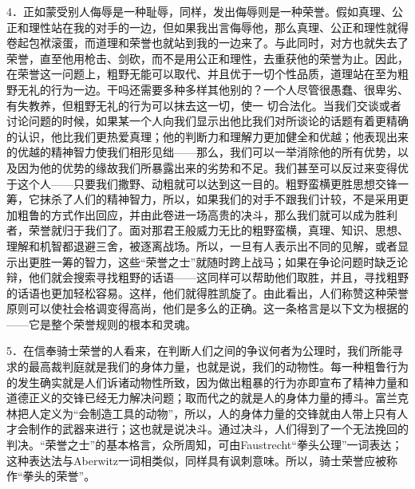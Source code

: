 \documentclass[12pt,oneside]{book}
\begin{document}
4．正如蒙受别人侮辱是一种耻辱，同样，发出侮辱则是一种荣誉。假如真理、公正和理性站在我的对手的一边，但如果我出言侮辱他，那么真理、公正和理性就得卷起包袱滚蛋，而道理和荣誉也就站到我的一边来了。与此同时，对方也就失去了荣誉，直至他用枪击、剑砍，而不是用公正和理性，去重获他的荣誉为止。因此，在荣誉这一问题上，粗野无能可以取代、并且优于一切个性品质，道理站在至为粗野无礼的行为一边。干吗还需要多种多样其他别的？一个人尽管很愚蠢、很卑劣、有失教养，但粗野无礼的行为可以抹去这一切，使一
切合法化。当我们交谈或者讨论问题的时候，如果某一个人向我们显示出他比我们对所谈论的话题有着更精确的认识，他比我们更热爱真理；他的判断力和理解力更加健全和优越；他表现出来的优越的精神智力使我们相形见绌——那么，我们可以一举消除他的所有优势，以及因为他的优势的缘故我们所暴露出来的劣势和不足。我们甚至可以反过来变得优于这个人——只要我们撒野、动粗就可以达到这一目的。粗野蛮横更胜思想交锋一筹，它抹杀了人们的精神智力，所以，如果我们的对手不跟我们计较，不是采用更加粗鲁的方式作出回应，并由此卷进一场高贵的决斗，那么我们就可以成为胜利者，荣誉就归于我们了。面对那君王般威力无比的粗野蛮横，真理、知识、思想、理解和机智都退避三舍，被逐离战场。所以，一旦有人表示出不同的见解，或者显示出更胜一筹的智力，这些“荣誉之士”就随时跨上战马；如果在争论问题时缺乏论辩，他们就会搜索寻找粗野的话语——这同样可以帮助他们取胜，并且，寻找粗野的话语也更加轻松容易。这样，他们就得胜凯旋了。由此看出，人们称赞这种荣誉原则可以使社会格调变得高尚，他们是多么的正确。这一条格言是以下文为根据的——它是整个荣誉规则的根本和灵魂。 

5．在信奉骑士荣誉的人看来，在判断人们之间的争议何者为公理时，我们所能寻求的最高裁判庭就是我们的身体力量，也就是说，我们的动物性。每一种粗鲁行为的发生确实就是人们诉诸动物性所致，因为做出粗暴的行为亦即宣布了精神力量和道德正义的交锋已经无力解决问题；取而代之的就是人的身体力量的搏斗。富兰克林把人定义为“会制造工具的动物”，所以，人的身体力量的交锋就由人带上只有人才会制作的武器来进行；这也就是说决斗。通过决斗，人们得到了一个无法挽回的判决。“荣誉之士”的基本格言，众所周知，可由Faustrecht“拳头公理”一词表达；这种表达法与Aberwitz一词相类似，同样具有讽刺意味。所以，骑士荣誉应被称作“拳头的荣誉”。 
\end{document}
